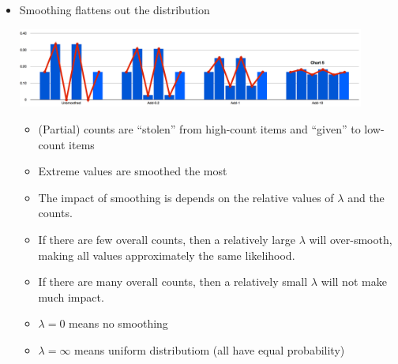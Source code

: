 \documentclass[11pt,letterpaper]{article}
\begin{document}
\begin{itemize}
  \item Smoothing flattens out the distribution
    \begin{center}\includegraphics[width=0.9\textwidth]{smoothing.png}\end{center}

    \begin{itemize}
      \item (Partial) counts are ``stolen'' from high-count items and ``given'' to low-count items
      \item Extreme values are smoothed the most
      \item The impact of smoothing is depends on the relative values of $\lambda$ and the counts.
      \item If there are few overall counts, then a relatively large $\lambda$ will over-smooth, making all values approximately the same likelihood.
      \item If there are many overall counts, then a relatively small $\lambda$ will not make much impact.
      \item $\lambda=0$ means no smoothing
      \item $\lambda=\infty$ means uniform distributiom (all have equal probability)
    \end{itemize}


\end{itemize}
\end{document}
